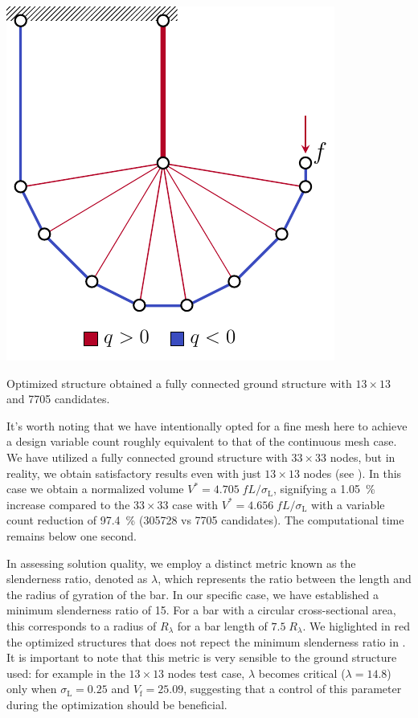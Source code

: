     \begin{marginfigure}
        \centering
        \includegraphics[width=0.8\linewidth]{figures/03_comparison_TO_TTO/12_tto_sol_13/L_tto_opt.pdf}
        \caption{Optimized structure obtained a fully connected ground structure with $13 \times 13$ and \num[group-separator={$\,$}]{7705} candidates.}
        \label{fig:03_L_tto_13}
    \end{marginfigure}
It's worth noting that we have intentionally opted for a fine mesh here to achieve a design variable count roughly equivalent to that of the continuous mesh case. We have utilized a fully connected ground structure with $33 \times 33$ nodes, but in reality, we obtain satisfactory results even with just $13 \times 13$ nodes (see ). In this case we obtain a normalized volume $V^*=4.705 \; fL/\sigma_\text{L}$, signifying a \qty{1.05}{\percent} increase compared to the $33 \times 33$ case with $V^*=4.656 \; fL/\sigma_\text{L}$ with a variable count reduction of \qty{97.4}{\percent} (\num[group-separator={$\,$}]{305728} vs \num[group-separator={$\,$}]{7705} candidates). The computational time remains below one second.

In assessing solution quality, we employ a distinct metric known as the slenderness ratio, denoted as $\lambda$, which represents the ratio between the length and the radius of gyration of the bar. In our specific case, we have established a minimum slenderness ratio of 15. For a bar with a circular cross-sectional area, this corresponds to a radius of $R_\lambda$ for a bar length of $7.5\;R_\lambda$. We higlighted in red the optimized structures that does not repect the minimum slenderness ratio in . It is important to note that this metric is very sensible to the ground structure used: for example in the $13\times13$ nodes test case, $\lambda$ becomes critical ($\lambda=14.8$) only when $\sigma_\text{L}=0.25$ and $V_\text{f}=25.09$, suggesting that a control of this parameter during the optimization should be beneficial.

